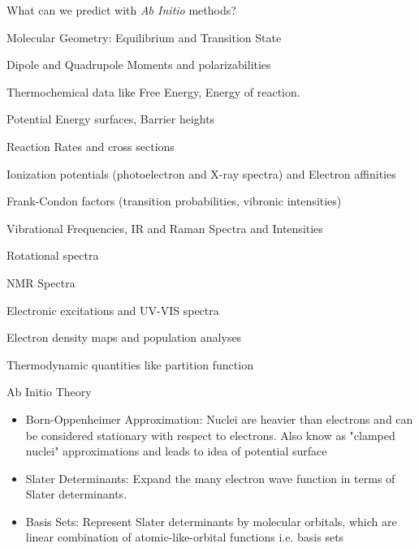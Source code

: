 \documentclass[slidestop,mathserif,compress,xcolor=svgnames]{beamer}
\begin{document}
\begin{frame}
\footnotesize{
\vspace{-0.1cm}
\begin{block}{What can we predict with \emph{Ab Initio} methods?}
\begin{itemize}
\footnotesize{
 \item Molecular Geometry: Equilibrium and Transition State
 \item Dipole and Quadrupole Moments and polarizabilities
 \item Thermochemical data like Free Energy, Energy of reaction.
 \item Potential Energy surfaces, Barrier heights
 \item Reaction Rates and cross sections
 \item Ionization potentials (photoelectron and X-ray spectra) and Electron affinities
 \item Frank-Condon factors (transition probabilities, vibronic intensities)
 \item Vibrational Frequencies, IR and Raman Spectra and Intensities
 \item Rotational spectra
 \item NMR Spectra
 \item Electronic excitations and UV-VIS spectra
 \item Electron density maps and population analyses
 \item Thermodynamic quantities like partition function
}
\end{itemize}
\end{block}
}
\end{frame}


\begin{frame}
\footnotesize{
\begin{block}{Ab Initio Theory}
\begin{itemize}
\item {\color{blue}Born-Oppenheimer Approximation}: Nuclei are heavier than electrons and can be considered stationary with respect to electrons. Also know as "clamped nuclei" approximations and leads to idea of potential surface
\item {\color{blue}Slater Determinants}: Expand the many electron wave function in terms of Slater determinants.
\item {\color{blue}Basis Sets}: Represent Slater determinants by molecular orbitals, which are linear combination of atomic-like-orbital functions i.e. basis sets
\end{itemize}
\end{block}
}
\end{frame}
\end{document}
